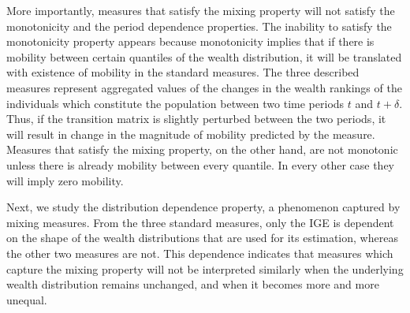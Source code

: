\documentclass[11pt]{article}
\numberwithin{equation}{section}
\begin{document}
More importantly, measures that satisfy the mixing property will not satisfy the monotonicity and the period dependence properties. The inability to satisfy the monotonicity property appears because monotonicity implies that if there is mobility between certain quantiles of the wealth distribution, it will be translated with existence of mobility in the standard measures. The three described measures represent aggregated values of the changes in the wealth rankings of the individuals which constitute the population between two time periods $t$ and $t+\delta$. Thus, if the transition matrix is slightly perturbed between the two periods, it will result in change in the magnitude of mobility predicted by the measure. Measures that satisfy the mixing property, on the other hand, are not monotonic unless there is already mobility between every quantile. In every other case they will imply zero mobility.

Next, we study the distribution dependence property, a phenomenon captured by mixing measures. From the three standard measures, only the IGE is dependent on the shape of the wealth distributions that are used for its estimation, whereas the other two measures are not. This dependence indicates that measures which capture the mixing property will not be interpreted similarly when the underlying wealth distribution remains unchanged, and when it becomes more and more unequal.

\end{document}
